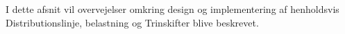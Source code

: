 
I dette afsnit vil overvejelser omkring design og implementering af henholdsvis Distributionslinje, belastning og Trinskifter blive beskrevet.